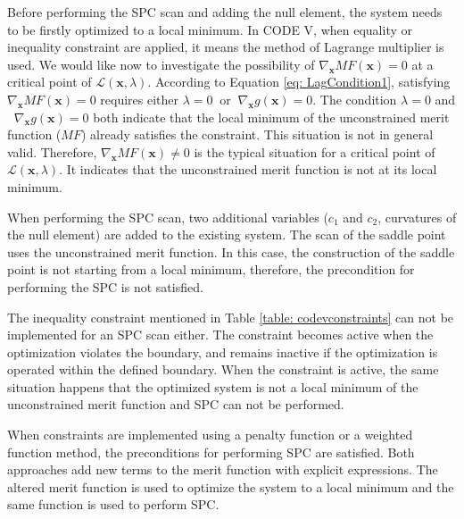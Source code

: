 Before performing the SPC scan and adding the null element, the system needs to be firstly optimized to a local minimum. In CODE V, when equality or inequality constraint are applied, it means the method of Lagrange multiplier is used. We would like now to investigate the possibility of $\nabla_\textbf{x}MF(\textbf{x}) = 0$ at a critical point of $\mathcal{L}(\textbf{x},\lambda)$. According to Equation \ref{eq: LagCondition1}, satisfying $\nabla_\textbf{x}MF(\textbf{x}) = 0$ requires either $\lambda =0 \;\; \text{or} \;\; \nabla_\textbf{x}g(\textbf{x})=0$. The condition $\lambda = 0$ and $\;\; \nabla_\textbf{x}g(\textbf{x})=0$ both indicate that the local minimum of the unconstrained merit function ($MF$) already satisfies the constraint. This situation is not in general valid. Therefore, $\nabla_\textbf{x}MF(\textbf{x}) \ne 0$ is the typical situation for a critical point of $\mathcal{L}(\textbf{x},\lambda)$. It indicates that the unconstrained merit function is not at its local minimum.  

When performing the SPC scan, two additional variables ($c_1$ and $c_2$, curvatures of the null element) are added to the existing system. The scan of the saddle point uses the unconstrained merit function. In this case, the construction of the saddle point is not starting from a local minimum, therefore, the precondition for performing the SPC is not satisfied.    

The inequality constraint mentioned in Table \ref{table: codevconstraints} can not be implemented for an SPC scan either. The constraint becomes active when the optimization violates the boundary, and remains inactive if the optimization is operated within the defined boundary. When the constraint is active, the same situation happens that the optimized system is not a local minimum of the unconstrained merit function and SPC can not be performed. 

When constraints are implemented using a penalty function or a weighted function method, the preconditions for performing SPC are satisfied. Both approaches add new terms to the merit function with explicit expressions. The altered merit function is used to optimize the system to a local minimum and the same function is used to perform SPC. 

